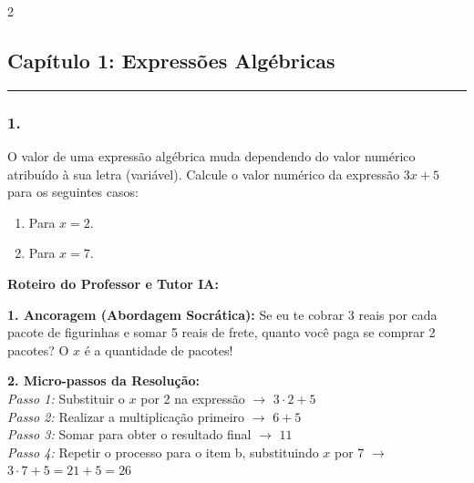 \par\vspace{0.3cm} 
\raggedcolumns
\begin{multicols*}{2}
\vspace{0.1cm}

\subsection*{Capítulo 1: Expressões Algébricas}
\vspace{-0.2cm}\noindent\rule{\linewidth}{1.5pt} 
\par\vspace{\espacoPosTitulo}
\subsubsection*{1.} 
\begin{enunciadoLiteral}
O valor de uma expressão algébrica muda dependendo do valor numérico atribuído à sua letra (variável). Calcule o valor numérico da expressão $ 3x + 5 $ para os seguintes casos:

\begin{enumerate}[label=\alph*), itemsep=\espacoAlt]
    \item Para $ x = 2 $.
    \item Para $ x = 7 $.
\end{enumerate}
\end{enunciadoLiteral}

\ifgabarito
    \begin{tcolorbox}[colback=CorTitUm!5, colframe=CorTitUm, boxrule=1pt, arc=4pt, left=6pt, right=6pt, top=6pt, bottom=6pt]
    \small\textbf{\textcolor{CorTitUm}{Roteiro do Professor e Tutor IA:}}\par\vspace{0.1cm}
    \color{CinzaEscuro}
    \textbf{1. Ancoragem (Abordagem Socrática):} Se eu te cobrar 3 reais por cada pacote de figurinhas e somar 5 reais de frete, quanto você paga se comprar 2 pacotes? O $x$ é a quantidade de pacotes!\par\vspace{0.1cm}
    
    \textbf{2. Micro-passos da Resolução:}\\
    \textit{Passo 1:} Substituir o $x$ por 2 na expressão $\rightarrow$ $ 3 \cdot 2 + 5 $\\
    \textit{Passo 2:} Realizar a multiplicação primeiro $\rightarrow$ $ 6 + 5 $\\
    \textit{Passo 3:} Somar para obter o resultado final $\rightarrow$ $ 11 $\\
    \textit{Passo 4:} Repetir o processo para o item b, substituindo $x$ por 7 $\rightarrow$ $ 3 \cdot 7 + 5 = 21 + 5 = 26 $\par\vspace{0.1cm}
    

\end{tcolorbox}
\end{multicols*}
